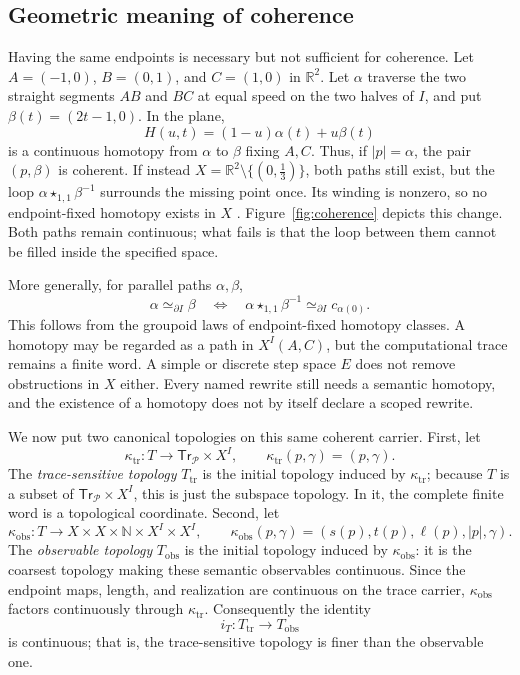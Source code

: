 \documentclass[10pt,reqno]{amsart}
\theoremstyle{definition}
\theoremstyle{plain}
\theoremstyle{remark}
\newcommand{\N}{\mathbb N}
\begin{document}
\subsection*{Geometric meaning of coherence}
Having the same endpoints is necessary but not sufficient for coherence.
Let $A=(-1,0)$, $B=(0,1)$, and $C=(1,0)$ in $\mathbb R^2$.
Let $\alpha$ traverse the two straight segments $AB$ and $BC$ at equal
speed on the two halves of $I$, and put $\beta(t)=(2t-1,0)$.
In the plane,
\[
 H(u,t)=(1-u)\alpha(t)+u\beta(t)
\]
is a continuous homotopy from $\alpha$ to $\beta$ fixing $A,C$.
Thus, if $|p|=\alpha$, the pair $(p,\beta)$ is coherent.
If instead $X=\mathbb R^2\setminus\{(0,\tfrac13)\}$, both paths still
exist, but the loop $\alpha\star_{1,1}\beta^{-1}$ surrounds the missing
point once.  Its winding is nonzero, so no endpoint-fixed homotopy exists
in $X$ \cite{Hatcher02}.  Figure~\ref{fig:coherence} depicts this change.
Both paths remain continuous; what fails is that the loop between them cannot
be filled inside the specified space.

More generally, for parallel paths $\alpha,\beta$,
\[
 \alpha\simeq_{\partial I}\beta
 \quad\Longleftrightarrow\quad
 \alpha\star_{1,1}\beta^{-1}\simeq_{\partial I}c_{\alpha(0)}.
\]
This follows from the groupoid laws of endpoint-fixed homotopy classes.
A homotopy may be regarded as a path in $X^I(A,C)$, but the computational
trace remains a finite word.  A simple or discrete step space $E$ does not
remove obstructions in $X$ either.  Every named rewrite still needs a semantic
homotopy, and the existence of a homotopy does not by itself declare a scoped
rewrite.


We now put two canonical topologies on this same coherent carrier.  First,
let
\[
  \kappa_{\mathrm{tr}}:T\longrightarrow
    \mathsf{Tr}_{\mathcal P}\times X^I,
  \qquad
  \kappa_{\mathrm{tr}}(p,\gamma)=(p,\gamma).
\]
The \emph{trace-sensitive topology} $T_{\mathrm{tr}}$ is the initial topology
induced by $\kappa_{\mathrm{tr}}$; because $T$ is a subset of
$\mathsf{Tr}_{\mathcal P}\times X^I$, this is just the subspace topology.
In it, the complete finite word is a topological coordinate.  Second, let
\[
  \kappa_{\mathrm{obs}}:T\longrightarrow X\times X\times\N\times X^I\times X^I,
  \qquad
  \kappa_{\mathrm{obs}}(p,\gamma)=(s(p),t(p),\ell(p),|p|,\gamma).
\]
The \emph{observable topology} $T_{\mathrm{obs}}$ is the initial topology
induced by $\kappa_{\mathrm{obs}}$:
it is the coarsest topology making these semantic observables continuous.
Since the endpoint maps, length, and realization are continuous on the trace
carrier, $\kappa_{\mathrm{obs}}$ factors continuously through
$\kappa_{\mathrm{tr}}$.  Consequently the identity
\[
  i_T:T_{\mathrm{tr}}\longrightarrow T_{\mathrm{obs}}
\]
is continuous; that is, the trace-sensitive topology is finer than the
observable one.
\end{document}
